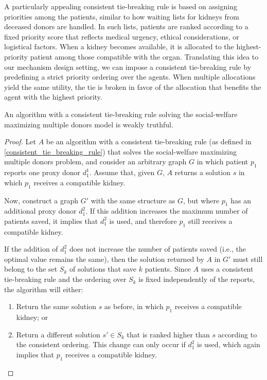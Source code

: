 A particularly appealing consistent tie-breaking rule is based on assigning priorities among the patients, similar to how waiting lists for kidneys from deceased donors are handled. In such lists, patients are ranked according to a fixed priority score that reflects medical urgency, ethical considerations, or logistical factors. When a kidney becomes available, it is allocated to the highest-priority patient among those compatible with the organ. Translating this idea to our mechanism design setting, we can impose a consistent tie-breaking rule by predefining a strict priority ordering over the agents. When multiple allocations yield the same utility, the tie is broken in favor of the allocation that benefits the agent with the highest priority.

\begin{lemma}
    An algorithm with a consistent tie-breaking rule solving the social-welfare maximizing multiple donors model is weakly truthful.
    \begin{proof}
    Let $A$ be an algorithm with a consistent tie-breaking rule (as defined in \autoref{consistent_tie_breaking_rule}) that solves the social-welfare maximizing multiple donors problem, and consider an arbitrary graph $G$ in which patient $p_1$ reports one proxy donor $d_1^1$. Assume that, given $G$, $A$ returns a solution $s$ in which $p_1$ receives a compatible kidney.
    
    Now, construct a graph $G'$ with the same structure as $G$, but where $p_1$ has an additional proxy donor $d_1^2$. If this addition increases the maximum number of patients saved, it implies that $d_1^2$ is used, and therefore $p_1$ still receives a compatible kidney.
    
    If the addition of $d_1^2$ does not increase the number of patients saved (i.e., the optimal value remains the same), then the solution returned by $A$ in $G'$ must still belong to the set $S_k$ of solutions that save $k$ patients. Since $A$ uses a consistent tie-breaking rule and the ordering over $S_k$ is fixed independently of the reports, the algorithm will either:
    \begin{enumerate}
        \item Return the same solution $s$ as before, in which $p_1$ receives a compatible kidney; or
        \item Return a different solution $s' \in S_k$ that is ranked higher than $s$ according to the consistent ordering. This change can only occur if $d_1^2$ is used, which again implies that $p_1$ receives a compatible kidney.
    \end{enumerate}
    \end{proof}
\end{lemma}



